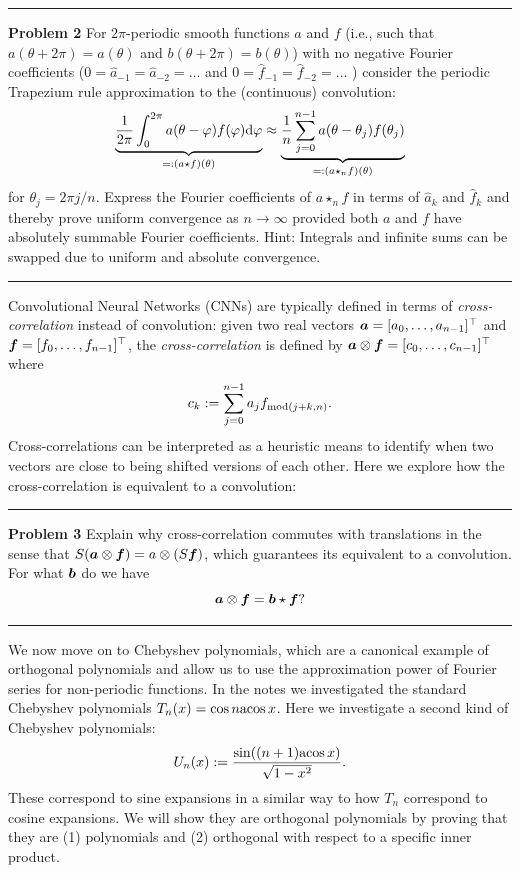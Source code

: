 \documentclass[12pt,a4paper]{article}
\def\a{ {\vc a} }
\def\b{ {\vc b} }
\def\f{ {\vc f} }
\def\acos{ {\rm acos}\, }
\begin{document}
\rule{\textwidth}{1pt}
\textbf{Problem 2}  For $2\ensuremath{\pi}$-periodic smooth functions $a$ and $f$ (i.e., such that $a(\ensuremath{\theta}+2\ensuremath{\pi}) = a(\ensuremath{\theta})$ and $b(\ensuremath{\theta}+2\ensuremath{\pi}) = b(\ensuremath{\theta})$) with no negative Fourier coefficients ($0 = \hat{a}_{-1} = \hat{a}_{-2} = \ensuremath{\ldots}$ and $0 = \hat{f}_{-1} = \hat{f}_{-2} = \ensuremath{\ldots}$ ) consider the periodic Trapezium rule approximation to the (continuous) convolution:
\[
\underbrace{ {1 \over 2\pi} \int_0^{2\pi}  a(\theta-\varphi) f(\varphi) {\rm d} \varphi}_{=: (a \star f)(\theta)} \approx \underbrace{{1 \over n} \sum_{j=0}^{n-1} a(\theta-\theta_j) f(\theta_j)}_{
=: (a \star_n f)(\theta)}
\]
for $\ensuremath{\theta}_j = 2\ensuremath{\pi}j/n$. Express the Fourier coefficients of $a \ensuremath{\star}_n f$  in terms of $\hat{a}_k$ and $\hat{f}_k$ and thereby prove uniform convergence as $n \ensuremath{\rightarrow} \ensuremath{\infty}$ provided both $a$ and $f$ have absolutely summable Fourier coefficients. Hint: Integrals and infinite sums can be swapped due to uniform and absolute convergence.

\rule{\textwidth}{1pt}
Convolutional Neural Networks (CNNs) are typically defined in terms of \emph{cross-correlation} instead of convolution: given two real vectors $\ensuremath{\bm{\a}} = [a_0,\ensuremath{\ldots},a_{n-1}]^\ensuremath{\top}$ and $\ensuremath{\bm{\f}} = [f_0,\ensuremath{\ldots},f_{n-1}]^\ensuremath{\top}$, the \emph{cross-correlation} is defined by $\ensuremath{\bm{\a}} \ensuremath{\otimes} \ensuremath{\bm{\f}} = [c_0,\ensuremath{\ldots},c_{n-1}]^\ensuremath{\top}$ where
\[
c_k := \ensuremath{\sum}_{j=0}^{n-1} a_j f_{{\rm mod}(j+k,n)}.
\]
Cross-correlations can be interpreted as a heuristic means to identify when two vectors are close to being shifted versions of each other. Here we explore how the cross-correlation is equivalent to a convolution:

\rule{\textwidth}{1pt}
\textbf{Problem 3}  Explain why cross-correlation commutes with translations in the sense that $S(\ensuremath{\bm{\a}} \ensuremath{\otimes} \ensuremath{\bm{\f}} ) = a \ensuremath{\otimes} (S\ensuremath{\bm{\f}})$, which guarantees its equivalent to a convolution. For what $\ensuremath{\bm{\b}}$ do we have
\[
\ensuremath{\bm{\a}} \ensuremath{\otimes} \ensuremath{\bm{\f}}  = \ensuremath{\bm{\b}} \ensuremath{\star} \ensuremath{\bm{\f}}?
\]
\rule{\textwidth}{1pt}
We now move on to Chebyshev polynomials, which are a canonical example of orthogonal polynomials and allow us to use the approximation power of Fourier series for non-periodic functions. In the notes we investigated the standard Chebyshev polynomials $T_n(x) = \cos n \acos x$. Here we investigate a second kind of Chebyshev polynomials:
\[
U_n(x) := {\sin((n+1) \acos x) \over \sqrt{1-x^2}}.
\]
These correspond to sine expansions in a similar way to how $T_n$ correspond to cosine expansions. We will show they are orthogonal polynomials by proving that they are (1) polynomials and (2) orthogonal with respect to a specific inner product.
\end{document}
